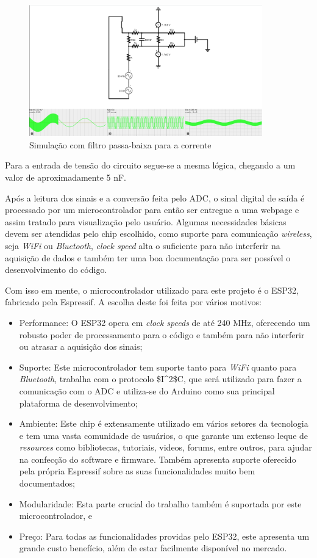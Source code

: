 \begin{figure}[htb!]
    \caption{Simulação com filtro passa-baixa para a corrente}
    \label{fig:simco2}
    \includegraphics[width=0.9\textwidth]{figuras/sim-co-2.png}
    \fonte{}
\end{figure}

Para a entrada de tensão do circuito segue-se a mesma lógica, chegando a um valor de aproximadamente 5 nF.

Após a leitura dos sinais e a conversão feita pelo ADC, o sinal digital de saída é processado por um microcontrolador para então ser entregue a uma webpage e assim tratado para visualização pelo usuário. Algumas necessidades básicas devem ser atendidas pelo chip escolhido, como suporte para comunicação \textit{wireless}, seja \textit{WiFi} ou \textit{Bluetooth}, \textit{clock speed} alta o suficiente para não interferir na aquisição de dados e também ter uma boa documentação para ser possível o desenvolvimento do código.

Com isso em mente, o microcontrolador utilizado para este projeto é o ESP32, fabricado pela Espressif. A escolha deste foi feita por vários motivos:

\begin{itemize}
    \item Performance: O ESP32 opera em \textit{clock speeds} de até 240 MHz, oferecendo um robusto poder de processamento para o código e também para não interferir ou atrasar a aquisição dos sinais;
    \item Suporte: Este microcontrolador tem suporte tanto para \textit{WiFi} quanto para \textit{Bluetooth}, trabalha com o protocolo \gls{$I^2$C}, que será utilizado para fazer a comunicação com o \gls{ADC} e utiliza-se do Arduino como sua principal plataforma de desenvolvimento;
    \item Ambiente: Este chip é extensamente utilizado em vários setores da tecnologia e tem uma vasta comunidade de usuários, o que garante um extenso leque de \textit{resources} como bibliotecas, tutoriais, videos, forums, entre outros, para ajudar na confecção do software e firmware. Também apresenta suporte oferecido pela própria Espressif sobre as suas funcionalidades muito bem documentados;
    \item Modularidade: Esta parte crucial do trabalho também é suportada por este microcontrolador, e
    \item Preço: Para todas as funcionalidades providas pelo ESP32, este apresenta um grande custo benefício, além de estar facilmente disponível no mercado.
\end{itemize}

